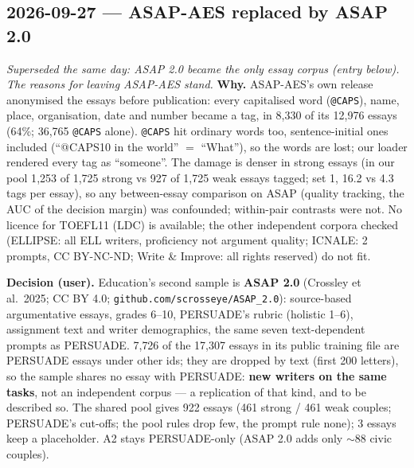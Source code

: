\documentclass{article}
\begin{document}
\subsection*{2026-09-27 --- ASAP-AES replaced by ASAP 2.0}
\emph{Superseded the same day: ASAP 2.0 became the only essay corpus (entry below). The reasons for leaving
ASAP-AES stand.}
\textbf{Why.} ASAP-AES's own release anonymised the essays before publication: every capitalised word
(\texttt{@CAPS}), name, place, organisation, date and number became a tag, in 8{,}330 of its 12{,}976 essays (64\%;
36{,}765 \texttt{@CAPS} alone). \texttt{@CAPS} hit ordinary words too, sentence-initial ones included (``@CAPS10 in
the world'' $=$ ``What''), so the words are lost; our loader rendered every tag as ``someone''. The damage is
denser in strong essays (in our pool 1{,}253 of 1{,}725 strong vs 927 of 1{,}725 weak essays tagged; set 1, 16.2 vs
4.3 tags per essay), so any between-essay comparison on ASAP (quality tracking, the AUC of the decision margin)
was confounded; within-pair contrasts were not. No licence for TOEFL11 (LDC) is available; the other
independent corpora checked (ELLIPSE: all ELL writers, proficiency not argument quality; ICNALE: 2 prompts,
CC BY-NC-ND; Write \& Improve: all rights reserved) do not fit.

\textbf{Decision (user).} Education's second sample is \textbf{ASAP 2.0} (Crossley et al.\ 2025; CC BY 4.0;
\texttt{github.com/scrosseye/ASAP\_2.0}): source-based argumentative essays, grades 6--10, PERSUADE's rubric
(holistic 1--6), assignment text and writer demographics, the same seven text-dependent prompts as PERSUADE.
7{,}726 of the 17{,}307 essays in its public training file are PERSUADE essays under other ids; they are dropped
by text (first 200 letters), so the sample shares no essay with PERSUADE: \textbf{new writers on the same tasks},
not an independent corpus --- a replication of that kind, and to be described so. The shared pool gives 922
essays (461 strong / 461 weak couples; PERSUADE's cut-offs; the pool rules drop few, the prompt rule none);
3 essays keep a placeholder. A2 stays PERSUADE-only (ASAP 2.0 adds only $\sim$88 civic couples).
\end{document}

